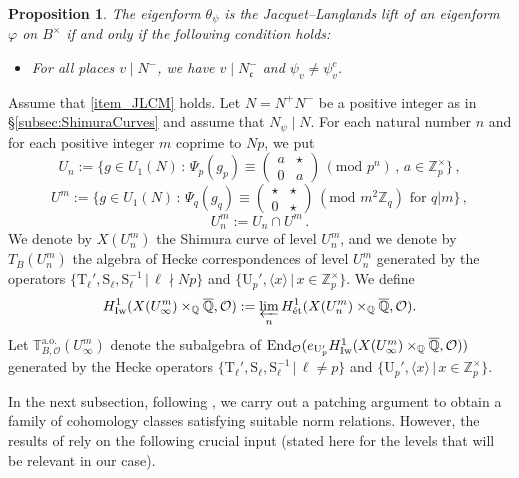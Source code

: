 \documentclass{amsart}
\makeatletter
\numberwithin{equation}{section}
\newcommand{\mylabel}[2]{#2\def\@currentlabel{#2}\label{#1}}
\newtheorem{proposition}[theorem]{Proposition}
\newcommand{\bb}{\mathbb}
\newcommand{\frk}{\mathfrak}
\newcommand{\Zp}{\mathbb{Z}_p}
\newcommand{\ZZ}{\mathbb{Z}}
\newcommand{\Iw}{\mathrm{Iw}}
\newcommand{\etale}{\textup{\'et}}
\newcommand{\End}{{\rm End}}
\makeatother
\begin{document}
\begin{proposition}
    The eigenform $\theta_\psi$ is the Jacquet--Langlands lift of an eigenform $\varphi$ on $B^\times$ if and only if the following condition holds:
    \begin{itemize}
        \item[\mylabel{item_JLCM}{$\mathbf{JL}_{\rm CM}$})] For all places $v\mid N^-$, we have $v\mid N_{\frk{c}}^-$ and $\psi_v\neq \psi_v^c$.
    \end{itemize}
\end{proposition}

Assume that \eqref{item_JLCM} holds. Let $N=N^+N^-$ be a positive integer as in \S\ref{subsec:ShimuraCurves} and assume that $N_\psi\mid N$. For each natural number $n$ and for each positive integer $m$ coprime to $N p$, we put
\[
U_n := \{ g \in U_1(N) \,:\, \Psi_p(g_p) \equiv \left( \begin{smallmatrix} a & \star  \\ 0 & a \end{smallmatrix}\right)\, (\text{mod } p^n)\, ,\,a \in\Zp^\times\}\,,
\]
\[
U^m:=\{ g \in U_1(N)\,:\, \Psi_q(g_q) \equiv \left( \begin{smallmatrix}
    \star & \star \\ 0 & \star
\end{smallmatrix} \right)\, (\text{mod } m^2 \ZZ_q ) \text{ for } q| m \}\,,
\]
\[
U_n^m:=U_n\cap U^m\,.
\]
We denote by $X(U_n^m)$ the Shimura curve of level $U_n^m$, and we denote by $T_B(U_n^m)$ the algebra of Hecke correspondences of level $U_n^m$ generated by the operators $\lbrace \mathrm{T}_\ell',\mathrm{S}_\ell, \mathrm{S}_\ell^{-1}\,\vert\, \ell\nmid Np\rbrace$ and $\lbrace \mathrm{U}_p',\langle x\rangle\,\vert\, x\in \bb{Z}_p^\times\rbrace$. We define
\[
H^1_{\Iw}(X(U_\infty^m)\times_{\bb{Q}}\overline{\bb{Q}},\mathcal{O}):=\varprojlim_n H^1_{\etale}(X(U_n^m)\times_{\bb{Q}}\overline{\bb{Q}},\mathcal{O}).
\]
Let $\mathbb{T}^{\mathrm{a.o.}}_{B,\mathcal{O}}(U_{\infty}^m)$ denote the subalgebra of $\End_{\mathcal{O}}(e_{\mathrm{U}_p'}H^1_{\Iw}(X(U_\infty^m)\times_{\bb{Q}}\overline{\bb{Q}},\mathcal{O}))$ generated by the Hecke operators $\lbrace \mathrm{T}_\ell',\mathrm{S}_\ell, \mathrm{S}_\ell^{-1}\,\vert\, \ell\neq p\rbrace$ and $\lbrace \mathrm{U}_p',\langle x\rangle\,\vert\, x\in \bb{Z}_p^\times\rbrace$.

In the next subsection, following \cite{LLZ2}, we carry out a patching argument to obtain a family of cohomology classes satisfying suitable norm relations. However, the results of \cite{LLZ2} rely on the following crucial input (stated here for the levels that will be relevant in our case).
\end{document}

